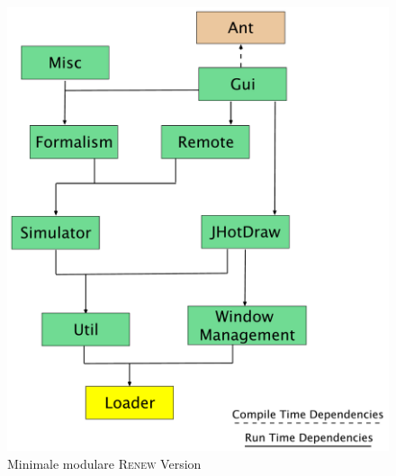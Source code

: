 	\begin{figure}[h!]
	  \centering
	  \includegraphics[width=\textwidth]{material/images/renew_plugin_dependencies-migrate_opt.pdf}
	  \caption{Minimale modulare \textsc{Renew} Version}
	  \label{fig:fin_res}
	\end{figure}
